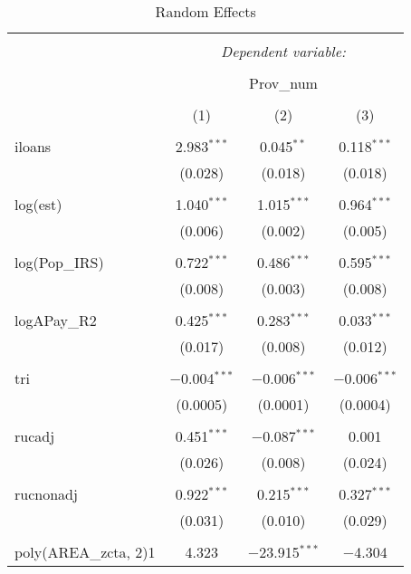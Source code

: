 
\begin{table}[!htbp] \centering 
  \caption{Random Effects} 
  \label{tab3:panelre} 
\begin{tabular}{@{\extracolsep{5pt}}lccc} 
\\[-1.8ex]\hline 
\hline \\[-1.8ex] 
 & \multicolumn{3}{c}{\textit{Dependent variable:}} \\ 
\cline{2-4} 
\\[-1.8ex] & \multicolumn{3}{c}{Prov\_num} \\ 
\\[-1.8ex] & (1) & (2) & (3)\\ 
\hline \\[-1.8ex] 
 iloans & 2.983$^{***}$ & 0.045$^{**}$ & 0.118$^{***}$ \\ 
  & (0.028) & (0.018) & (0.018) \\ 
  & & & \\ 
 log(est) & 1.040$^{***}$ & 1.015$^{***}$ & 0.964$^{***}$ \\ 
  & (0.006) & (0.002) & (0.005) \\ 
  & & & \\ 
 log(Pop\_IRS) & 0.722$^{***}$ & 0.486$^{***}$ & 0.595$^{***}$ \\ 
  & (0.008) & (0.003) & (0.008) \\ 
  & & & \\ 
 logAPay\_R2 & 0.425$^{***}$ & 0.283$^{***}$ & 0.033$^{***}$ \\ 
  & (0.017) & (0.008) & (0.012) \\ 
  & & & \\ 
 tri & $-$0.004$^{***}$ & $-$0.006$^{***}$ & $-$0.006$^{***}$ \\ 
  & (0.0005) & (0.0001) & (0.0004) \\ 
  & & & \\ 
 rucadj & 0.451$^{***}$ & $-$0.087$^{***}$ & 0.001 \\ 
  & (0.026) & (0.008) & (0.024) \\ 
  & & & \\ 
 rucnonadj & 0.922$^{***}$ & 0.215$^{***}$ & 0.327$^{***}$ \\ 
  & (0.031) & (0.010) & (0.029) \\ 
  & & & \\ 
 poly(AREA\_zcta, 2)1 & 4.323 & $-$23.915$^{***}$ & $-$4.304 \\ 

\end{tabular}
\end{table}
